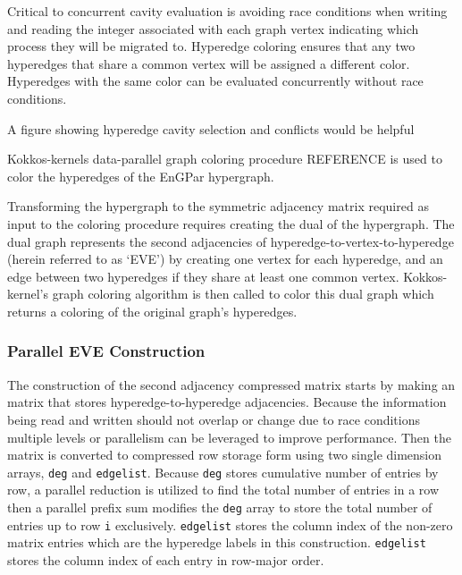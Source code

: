\documentclass[graybox]{svmult}
\begin{document}
Critical to concurrent cavity evaluation is avoiding race conditions when
writing and reading the integer associated with each graph vertex indicating
which process they will be migrated to.
Hyperedge coloring ensures that any two hyperedges that share a common vertex
will be assigned a different color.
Hyperedges with the same color can be evaluated concurrently without
race conditions.

{\color{red}A figure showing hyperedge cavity selection and conflicts would be
helpful}

Kokkos-kernels data-parallel graph coloring procedure REFERENCE is used to
color the hyperedges of the EnGPar hypergraph.

Transforming the hypergraph to the symmetric adjacency matrix required as input
to the coloring procedure requires creating the dual of the hypergraph.
The dual graph represents the second adjacencies of
hyperedge-to-vertex-to-hyperedge (herein referred to as `EVE') by creating one
vertex for each hyperedge, and an edge between two hyperedges if they share at
least one common vertex.
Kokkos-kernel's graph coloring algorithm is then called to color this dual graph
which returns a coloring of the original graph's hyperedges.

\subsubsection{Parallel EVE Construction}

The construction of the second adjacency compressed matrix starts by making an
matrix that stores hyperedge-to-hyperedge adjacencies.
Because the information being read and written should not overlap or change due
to race conditions multiple levels or parallelism can be leveraged to improve
performance.
Then the matrix is converted to compressed row storage form using two single
dimension arrays, \verb|deg| and \verb|edgelist|.
Because \verb|deg| stores cumulative number of entries by row, a parallel
reduction is utilized to find the total number of entries in a row then a
parallel prefix sum  modifies the \verb|deg| array to store the total number of
entries up to row \verb|i| exclusively.
\verb|edgelist| stores the column index of the non-zero matrix entries which are
the hyperedge labels in this construction.
\verb|edgelist| stores the column index of each entry in row-major order.
\end{document}
